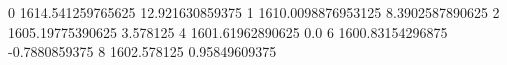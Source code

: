 0 1614.541259765625 12.921630859375
1 1610.0098876953125 8.3902587890625
2 1605.19775390625 3.578125
4 1601.61962890625 0.0
6 1600.83154296875 -0.7880859375
8 1602.578125 0.95849609375
